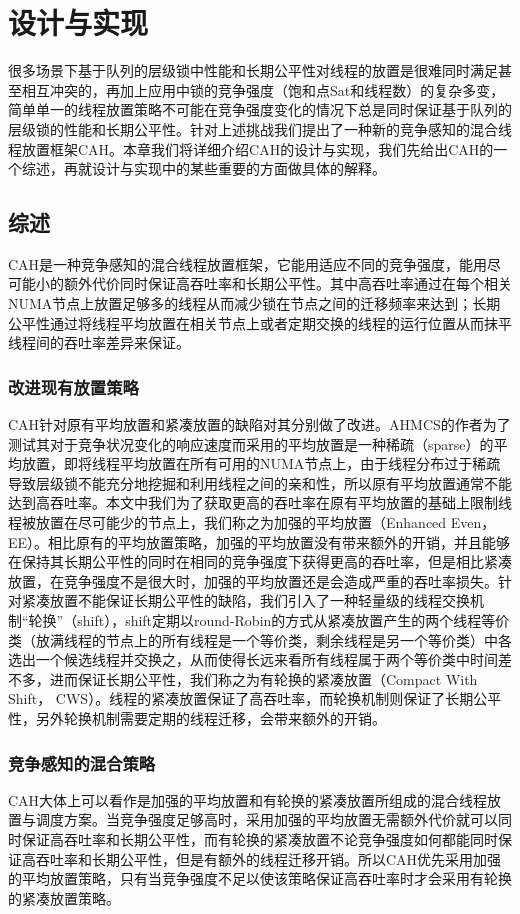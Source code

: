 \chapter{设计与实现}
\label{chap:faq}
很多场景下基于队列的层级锁中性能和长期公平性对线程的放置是很难同时满足甚至相互冲突的，再加上应用中锁的竞争强度（饱和点Sat和线程数）的复杂多变，简单单一的线程放置策略不可能在竞争强度变化的情况下总是同时保证基于队列的层级锁的性能和长期公平性。针对上述挑战我们提出了一种新的竞争感知的混合线程放置框架CAH。本章我们将详细介绍CAH的设计与实现，我们先给出CAH的一个综述，再就设计与实现中的某些重要的方面做具体的解释。

\section{综述}
CAH是一种竞争感知的混合线程放置框架，它能用适应不同的竞争强度，能用尽可能小的额外代价同时保证高吞吐率和长期公平性。其中高吞吐率通过在每个相关NUMA节点上放置足够多的线程从而减少锁在节点之间的迁移频率来达到；长期公平性通过将线程平均放置在相关节点上或者定期交换的线程的运行位置从而抹平线程间的吞吐率差异来保证。

\subsection{改进现有放置策略}
CAH针对原有平均放置和紧凑放置的缺陷对其分别做了改进。AHMCS的作者为了测试其对于竞争状况变化的响应速度而采用的平均放置是一种稀疏（sparse）的平均放置，即将线程平均放置在所有可用的NUMA节点上，由于线程分布过于稀疏导致层级锁不能充分地挖掘和利用线程之间的亲和性，所以原有平均放置通常不能达到高吞吐率。本文中我们为了获取更高的吞吐率在原有平均放置的基础上限制线程被放置在尽可能少的节点上，我们称之为加强的平均放置（Enhanced Even， EE）。相比原有的平均放置策略，加强的平均放置没有带来额外的开销，并且能够在保持其长期公平性的同时在相同的竞争强度下获得更高的吞吐率，但是相比紧凑放置，在竞争强度不是很大时，加强的平均放置还是会造成严重的吞吐率损失。针对紧凑放置不能保证长期公平性的缺陷，我们引入了一种轻量级的线程交换机制“轮换”（shift），shift定期以round-Robin的方式从紧凑放置产生的两个线程等价类（放满线程的节点上的所有线程是一个等价类，剩余线程是另一个等价类）中各选出一个候选线程并交换之，从而使得长远来看所有线程属于两个等价类中时间差不多，进而保证长期公平性，我们称之为有轮换的紧凑放置（Compact With Shift， CWS）。线程的紧凑放置保证了高吞吐率，而轮换机制则保证了长期公平性，另外轮换机制需要定期的线程迁移，会带来额外的开销。

\subsection{竞争感知的混合策略}
CAH大体上可以看作是加强的平均放置和有轮换的紧凑放置所组成的混合线程放置与调度方案。当竞争强度足够高时，采用加强的平均放置无需额外代价就可以同时保证高吞吐率和长期公平性，而有轮换的紧凑放置不论竞争强度如何都能同时保证高吞吐率和长期公平性，但是有额外的线程迁移开销。所以CAH优先采用加强的平均放置策略，只有当竞争强度不足以使该策略保证高吞吐率时才会采用有轮换的紧凑放置策略。

